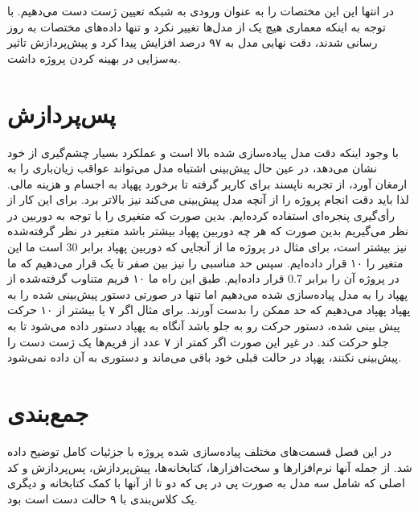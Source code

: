 در انتها این این مختصات را به عنوان ورودی به شبکه تعیین ژست دست می‌دهیم. با توجه به اینکه معماری هیچ یک از مدل‌ها تغییر نکرد و تنها داده‌های مختصات به روز رسانی شدند، 
دقت نهایی مدل به ۹۷ درصد افزایش پیدا کرد و پیش‌پردازش تاثیر به‌سزایی در بهینه کردن پروژه داشت.


\section{پس‌پردازش}
با وجود اینکه دقت مدل پیاده‌سازی شده بالا است و عملکرد بسیار چشم‌گیری از خود نشان می‌دهد، در عین حال پیش‌بینی اشتباه مدل می‌تواند عواقب زیان‌باری را به ارمغان آورد، 
از تجربه ناپسند برای کاربر گرفته تا برخورد پهپاد به اجسام و هزینه مالی. لذا باید دقت انجام پروژه را از آنچه مدل پیش‌بینی می‌کند نیز بالاتر برد. برای این کار از رأی‌گیری پنجره‌ای 
استفاده کرده‌ایم. بدین صورت که متغیری را با توجه به  دوربین در نظر می‌گیریم بدین صورت که هر چه  دوربین پهپاد بیشتر باشد متغیر در نظر گرفته‌شده نیز بیشتر 
است، برای مثال در پروژه ما از آنجایی که دوربین پهپاد برابر 30  است ما این متغیر را ۱۰ قرار داده‌ایم.  سپس حد مناسبی را نیز بین صفر تا یک قرار می‌دهیم که ما در 
پروژه آن را برابر 0.7  قرار داده‌ایم. طبق این راه ما ۱۰ فریم متناوب گرفته‌شده از پهپاد را به مدل پیاده‌سازی شده می‌دهیم اما تنها در صورتی دستور پیش‌بینی شده را به پهپاد
پهپاد می‌دهیم که حد ممکن را بدست آورند. برای مثال اگر ۷ یا بیشتر از ۱۰ حرکت پیش بینی شده، دستور حرکت رو به جلو باشد آنگاه به پهپاد دستور داده می‌شود تا به جلو حرکت کند. 
در غیر این صورت اگر کمتر از ۷ عدد از فریم‌ها یک ژست دست را پیش‌بینی نکنند، پهپاد در حالت قبلی خود باقی می‌ماند و دستوری به آن داده نمی‌شود.


\section{جمع‌بندی}
در این فصل قسمت‌های مختلف پیاده‌سازی شده پروژه با جزئیات کامل توضیح داده شد. از جمله آنها نرم‌افزار‌ها و سخت‌افزارها، کتابخانه‌ها، پیش‌پردازش، پس‌پردازش و کد اصلی که شامل سه مدل به صورت پی در پی که دو تا از آنها با کمک کتابخانه  و دیگری یک کلاس‌بندی با ۹ حالت دست است بود.

